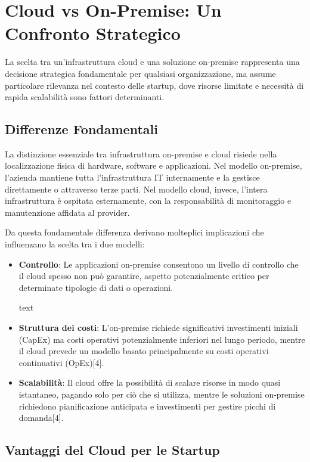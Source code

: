 \documentclass[a4paper,12pt]{report}
\begin{document}
\section{Cloud vs On-Premise: Un Confronto Strategico}

La scelta tra un'infrastruttura cloud e una soluzione on-premise rappresenta una decisione strategica fondamentale per qualsiasi organizzazione, ma assume particolare rilevanza nel contesto delle startup, dove risorse limitate e necessità di rapida scalabilità sono fattori determinanti.

\subsection{Differenze Fondamentali}

La distinzione essenziale tra infrastruttura on-premise e cloud risiede nella localizzazione fisica di hardware, software e applicazioni. Nel modello on-premise, l'azienda mantiene tutta l'infrastruttura IT internamente e la gestisce direttamente o attraverso terze parti. Nel modello cloud, invece, l'intera infrastruttura è ospitata esternamente, con la responsabilità di monitoraggio e manutenzione affidata al provider.

Da questa fondamentale differenza derivano molteplici implicazioni che influenzano la scelta tra i due modelli:

\begin{itemize}
\item \textbf{Controllo}: Le applicazioni on-premise consentono un livello di controllo che il cloud spesso non può garantire, aspetto potenzialmente critico per determinate tipologie di dati o operazioni.

text
\item \textbf{Struttura dei costi}: L'on-premise richiede significativi investimenti iniziali (CapEx) ma costi operativi potenzialmente inferiori nel lungo periodo, mentre il cloud prevede un modello basato principalmente su costi operativi continuativi (OpEx)[4].

\item \textbf{Scalabilità}: Il cloud offre la possibilità di scalare risorse in modo quasi istantaneo, pagando solo per ciò che si utilizza, mentre le soluzioni on-premise richiedono pianificazione anticipata e investimenti per gestire picchi di domanda[4].
\end{itemize}

\subsection{Vantaggi del Cloud per le Startup}
\end{document}
